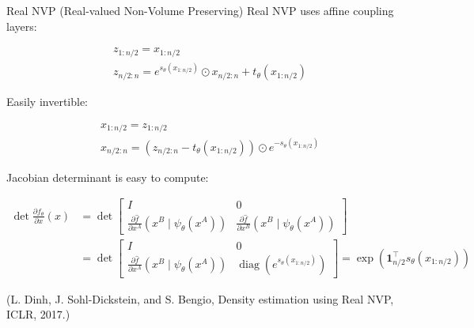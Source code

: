 \begin{frame}[allowframebreaks]

\begin{mydefinitionblock}{10.27}{Real NVP (Real-valued Non-Volume Preserving)}
    Real NVP uses affine coupling layers:

    $$
    \begin{aligned}
    & z_{1: n / 2}=x_{1: n / 2} \\
    & z_{n / 2: n}=e^{s_{\theta}\left(x_{1: n / 2}\right)} \odot x_{n / 2: n}+t_{\theta}\left(x_{1: n / 2}\right)
    \end{aligned}
    $$

    Easily invertible:

    $$
    \begin{aligned}
    & x_{1: n / 2}=z_{1: n / 2} \\
    & x_{n / 2: n}=\left(z_{n / 2: n}-t_{\theta}\left(x_{1: n / 2}\right)\right) \odot e^{-s_{\theta}\left(x_{1: n / 2}\right)}
    \end{aligned}
    $$

    Jacobian determinant is easy to compute:

    $$
    \begin{aligned}
    \operatorname{det} \frac{\partial f_{\theta}}{\partial x}(x) & =\operatorname{det}\left[\begin{array}{cc}
    I & 0 \\
    \frac{\partial \hat{f}}{\partial x^{A}}\left(x^{B} \mid \psi_{\theta}\left(x^{A}\right)\right) & \frac{\partial \hat{f}}{\partial x^{B}}\left(x^{B} \mid \psi_{\theta}\left(x^{A}\right)\right)
    \end{array}\right] \\
    & =\operatorname{det}\left[\begin{array}{cc}
    I & 0 \\
    \frac{\partial \hat{f}}{\partial x^{A}}\left(x^{B} \mid \psi_{\theta}\left(x^{A}\right)\right) & \operatorname{diag}\left(e^{s_{\theta}\left(x_{1: n / 2}\right)}\right)
    \end{array}\right]=\exp \left(\mathbf{1}_{n / 2}^{\top} s_{\theta}\left(x_{1: n / 2}\right)\right)
    \end{aligned}
    $$

    (L. Dinh, J. Sohl-Dickstein, and S. Bengio, Density estimation using Real NVP, ICLR, 2017.)
\end{mydefinitionblock}

\end{frame}


